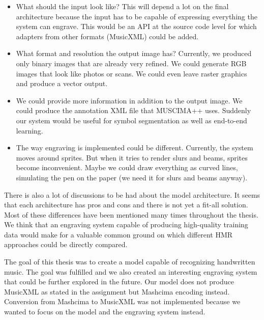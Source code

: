 \begin{itemize}
    \item What should the input look like? This will depend a lot on the final architecture because the input has to be capable of expressing everything the system can engrave. This would be an API at the source code level for which adapters from other formats (MusicXML) could be added.

    \item What format and resolution the output image has? Currently, we produced only binary images that are already very refined. We could generate RGB images that look like photos or scans. We could even leave raster graphics and produce a vector output.

    \item We could provide more information in addition to the output image. We could produce the annotation XML file that MUSCIMA++ uses. Suddenly our system would be useful for symbol segmentation as well as end-to-end learning.

    \item The way engraving is implemented could be different. Currently, the system moves around sprites. But when it tries to render slurs and beams, sprites become inconvenient. Maybe we could draw everything as curved lines, simulating the pen on the paper (we need it for slurs and beams anyway).
\end{itemize}

There is also a lot of discussions to be had about the model architecture. It seems that each architecture has pros and cons and there is not yet a fit-all solution. Most of these differences have been mentioned many times throughout the thesis. We think that an engraving system capable of producing high-quality training data would make for a valuable common ground on which different HMR approaches could be directly compared.

The goal of this thesis was to create a model capable of recognizing handwritten music. The goal was fulfilled and we also created an interesting engraving system that could be further explored in the future. Our model does not produce MusicXML as stated in the assignment but Mashcima encoding instead. Conversion from Mashcima to MusicXML was not implemented because we wanted to focus on the model and the engraving system instead.

